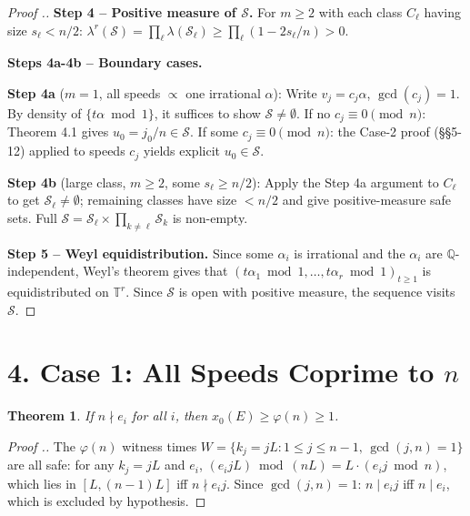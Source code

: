 \documentclass[11pt,a4paper]{article}
\theoremstyle{plain}
\newtheorem{theorem}{Theorem}[section]
\theoremstyle{definition}
\theoremstyle{remark}
\begin{document}
\begin{proof}[Proof .]
\textbf{Step 4 -- Positive measure of $\mathcal{S}$.} For $m \geq 2$ with each class $C_\ell$ having size $s_\ell < n/2$: $\lambda^r(\mathcal{S}) = \prod_\ell \lambda(\mathcal{S}_\ell) \geq \prod_\ell (1 - 2s_\ell/n) > 0$.

\textbf{Steps 4a-4b -- Boundary cases.}

\textbf{Step 4a} ($m=1$, all speeds $\propto$ one irrational $\alpha$): Write $v_j = c_j\alpha$, $\gcd(c_j)=1$. By density of $\{t\alpha \bmod 1\}$, it suffices to show $\mathcal{S} \neq \emptyset$. If no $c_j \equiv 0 \pmod n$: Theorem 4.1 gives $u_0 = j_0/n \in \mathcal{S}$. If some $c_j \equiv 0 \pmod n$: the Case-2 proof (§§5-12) applied to speeds $c_j$ yields explicit $u_0 \in \mathcal{S}$.

\textbf{Step 4b} (large class, $m \geq 2$, some $s_\ell \geq n/2$): Apply the Step 4a argument to $C_\ell$ to get $\mathcal{S}_\ell \neq \emptyset$; remaining classes have size $< n/2$ and give positive-measure safe sets. Full $\mathcal{S} = \mathcal{S}_\ell \times \prod_{k\neq\ell}\mathcal{S}_k$ is non-empty.

\textbf{Step 5 -- Weyl equidistribution.} Since some $\alpha_i$ is irrational and the $\alpha_i$ are $\mathbb{Q}$-independent, Weyl's theorem gives that $(t\alpha_1 \bmod 1, \ldots, t\alpha_r \bmod 1)_{t \geq 1}$ is equidistributed on $\mathbb{T}^r$. Since $\mathcal{S}$ is open with positive measure, the sequence visits $\mathcal{S}$.
\end{proof}


\medskip



\section{4. Case 1: All Speeds Coprime to $n$}



\begin{theorem}
If $n \nmid e_i$ for all $i$, then $x_0(E) \geq \varphi(n) \geq 1$.

\end{theorem}

\begin{proof}[Proof .]
The $\varphi(n)$ witness times $W = \{k_j = jL : 1 \leq j \leq n-1,\, \gcd(j,n) = 1\}$ are all safe: for any $k_j = jL$ and $e_i$, $(e_i jL) \bmod (nL) = L\cdot(e_i j \bmod n)$, which lies in $[L,(n-1)L]$ iff $n \nmid e_ij$. Since $\gcd(j,n)=1$: $n \mid e_ij$ iff $n \mid e_i$, which is excluded by hypothesis.
\end{proof}
\end{document}
